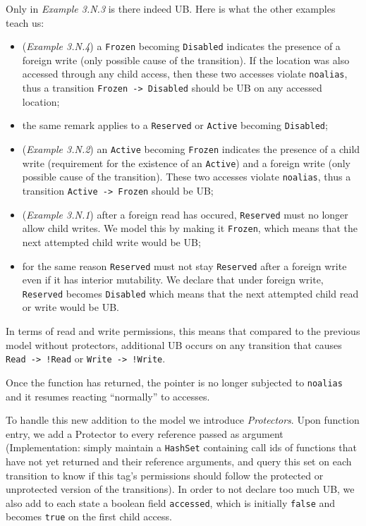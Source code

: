 \documentclass[a4paper,11pt]{article}
\theoremstyle{plain}
\theoremstyle{definition}
\theoremstyle{remark}
\newcommand{\tcode}[1]{\texttt{#1}}
\newcommand{\tperm}[1]{\texttt{#1}}
\begin{document}
Only in \textit{Example 3.N.3} is there indeed UB. Here is what the other examples teach
us:

\begin{itemize}
    \item (\textit{Example 3.N.4}) a \tperm{Frozen} becoming \tperm{Disabled} indicates the presence of a
        foreign write (only possible cause of the transition). If the location was also accessed
        through any child access, then these two accesses violate \tcode{noalias}, thus a transition
        \tperm{Frozen -> Disabled} should be UB on any accessed location;
    \item the same remark applies to a \tperm{Reserved} or \tperm{Active} becoming \tperm{Disabled};
    \item (\textit{Example 3.N.2}) an \tperm{Active} becoming \tperm{Frozen} indicates the presence of a child write
        (requirement for the existence of an \texttt{Active}) and a foreign write (only possible cause
        of the transition). These two accesses violate \tcode{noalias}, thus a transition \tperm{Active -> Frozen}
        should be UB;
    \item (\textit{Example 3.N.1}) after a foreign read has occured, \tperm{Reserved} must no longer allow
        child writes. We model this by making it \tperm{Frozen}, which means that the next attempted child write
        would be UB;
    \item for the same reason \tperm{Reserved} must not stay \tperm{Reserved} after a foreign write even
        if it has interior mutability. We declare that under foreign write, \tperm{Reserved} becomes
        \tperm{Disabled} which means that the next attempted child read or write would be UB.
\end{itemize}

In terms of read and write permissions, this means that compared to the previous
model without protectors, additional UB occurs on any transition that causes
\tperm{Read -> !Read} or \tperm{Write -> !Write}.

Once the function has returned, the pointer is no longer subjected to \tcode{noalias}
and it resumes reacting ``normally'' to accesses.

To handle this new addition to the model we introduce \textit{Protectors}. Upon function
entry, we add a Protector to every reference passed as argument (Implementation:
simply maintain a \tcode{HashSet} containing call ids of functions that have not yet
returned and their reference arguments, and query this set on each transition
to know if this tag's permissions should follow the protected or unprotected
version of the transitions). In order to not declare too much UB, we also add
to each state a boolean field \tcode{accessed}, which is initially \tcode{false} and becomes
\tcode{true} on the first child access.
\end{document}
